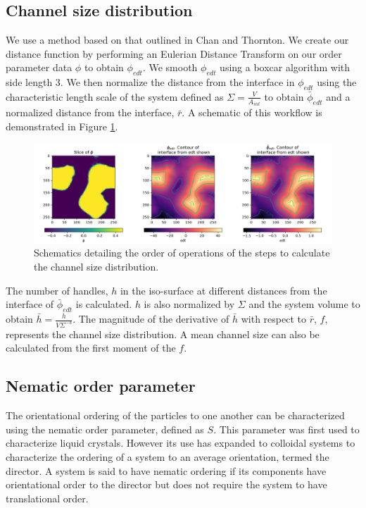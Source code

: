 \subsection{Channel size distribution}
\label{section:channel_size_distribution}

We use a method based on that outlined in Chan and Thornton. We create our distance function by performing an Eulerian Distance Transform on 
our order parameter data $\phi$ to obtain $\phi_{edt}$. \cite{chan_channel_2012} We smooth $\phi_{edt}$ using a boxcar algorithm with side length 3. 
We then normalize the distance from the interface in $\phi_{edt}$ using the characteristic length scale of the system defined as $\Sigma = \frac{V}{A_{int}}$
to obtain $\bar{\phi}_{edt}$ and a normalized distance from the interface, $\bar{r}$. A schematic of this workflow is demonstrated in Figure \ref{fig:csd_prep_viz}.

\begin{figure}
    \centering
    \includegraphics[scale = 0.5]{figures/analysis/csd_prep.png}
    \caption{Schematics detailing the order of operations of the steps to calculate the channel size distribution.}
    \label{fig:csd_prep_viz}
\end{figure}

The number of handles, $h$
in the iso-surface at different distances from the interface of $\bar{\phi}_{edt}$ is calculated. $h$ is also normalized by $\Sigma$ and the system volume
to obtain $\bar{h} = \frac{h}{V\Sigma^{-3}}$. The magnitude of the derivative of $\bar{h}$ with respect to $\bar{r}$, $f$, represents the channel size distribution.
A mean channel size can also be calculated from the first moment of the $f$.

\subsection{Nematic order parameter}
\label{section:nematic_order_parameter}

The orientational ordering of the particles to one another can be characterized using the nematic order parameter, 
defined as $S$. This parameter was first used to characterize liquid crystals. However its use has expanded to colloidal 
systems to characterize the ordering of a system to an average orientation, termed the director. A system is said to have 
nematic ordering if its components have orientational order to the director but does not require the system to have 
translational order.

